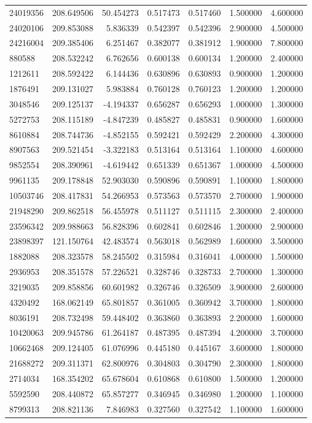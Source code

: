 \begin{tabular}{lrrrrrr}
24019356 & 208.649506 & 50.454273 & 0.517473 & 0.517460 & 1.500000 & 4.600000 \\
24020106 & 209.853088 & 5.836339 & 0.542397 & 0.542396 & 2.900000 & 4.500000 \\
24216004 & 209.385406 & 6.251467 & 0.382077 & 0.381912 & 1.900000 & 7.800000 \\
880588 & 208.532242 & 6.762656 & 0.600138 & 0.600134 & 1.200000 & 2.400000 \\
1212611 & 208.592422 & 6.144436 & 0.630896 & 0.630893 & 0.900000 & 1.200000 \\
1876491 & 209.131027 & 5.983884 & 0.760128 & 0.760123 & 1.200000 & 1.200000 \\
3048546 & 209.125137 & -4.194337 & 0.656287 & 0.656293 & 1.000000 & 1.300000 \\
5272753 & 208.115189 & -4.847239 & 0.485827 & 0.485831 & 0.900000 & 1.600000 \\
8610884 & 208.744736 & -4.852155 & 0.592421 & 0.592429 & 2.200000 & 4.300000 \\
8907563 & 209.521454 & -3.322183 & 0.513164 & 0.513164 & 1.100000 & 4.600000 \\
9852554 & 208.390961 & -4.619442 & 0.651339 & 0.651367 & 1.000000 & 4.500000 \\
9961135 & 209.178848 & 52.903030 & 0.590896 & 0.590891 & 1.100000 & 1.800000 \\
10503746 & 208.417831 & 54.266953 & 0.573563 & 0.573570 & 2.700000 & 1.900000 \\
21948290 & 209.862518 & 56.455978 & 0.511127 & 0.511115 & 2.300000 & 2.400000 \\
23596342 & 209.988663 & 56.828396 & 0.602841 & 0.602846 & 1.200000 & 2.900000 \\
23898397 & 121.150764 & 42.483574 & 0.563018 & 0.562989 & 1.600000 & 3.500000 \\
1882088 & 208.323578 & 58.245502 & 0.315984 & 0.316041 & 4.000000 & 1.500000 \\
2936953 & 208.351578 & 57.226521 & 0.328746 & 0.328733 & 2.700000 & 1.300000 \\
3219035 & 209.858856 & 60.601982 & 0.326746 & 0.326509 & 3.900000 & 2.600000 \\
4320492 & 168.062149 & 65.801857 & 0.361005 & 0.360942 & 3.700000 & 1.800000 \\
8036191 & 208.732498 & 59.448402 & 0.363860 & 0.363893 & 2.200000 & 1.600000 \\
10420063 & 209.945786 & 61.264187 & 0.487395 & 0.487394 & 4.200000 & 3.700000 \\
10662468 & 209.124405 & 61.076996 & 0.445180 & 0.445167 & 3.600000 & 1.800000 \\
21688272 & 209.311371 & 62.800976 & 0.304803 & 0.304790 & 2.300000 & 1.800000 \\
2714034 & 168.354202 & 65.678604 & 0.610868 & 0.610800 & 1.500000 & 1.200000 \\
5592590 & 208.440872 & 65.857277 & 0.346945 & 0.346980 & 1.200000 & 1.100000 \\
8799313 & 208.821136 & 7.846983 & 0.327560 & 0.327542 & 1.100000 & 1.600000 \\
\bottomrule
\end{tabular}
